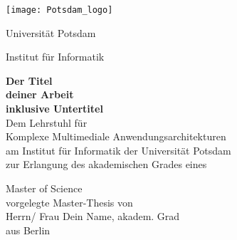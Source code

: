 \thispagestyle{empty}
\begin{center}
		
    \texttt{[image: Potsdam\_logo]}\\
    \vspace{.5cm}
    
    {\Large \sc Universität Potsdam}\\
    \vspace{1cm}
    
    {\Huge \sc Institut für Informatik\\[1mm]}
    
    \vspace{2cm}
    {\Huge \textbf{Der Titel}}\\
    \vspace*{3mm}
    {\Huge \textbf{deiner Arbeit}}\\
    \vspace*{3mm}
    {\large \textbf{inklusive Untertitel}}\\
    
    \vspace{2.0cm}
    {\large Dem Lehrstuhl für}\\
    {\large Komplexe Multimediale Anwendungsarchitekturen}\\
    {\large am Institut für Informatik der Universität Potsdam}\\
    {\large zur Erlangung des akademischen Grades eines}\\
    \vspace{1cm}
    
    {\Large \sc Master of Science}\\
    \vspace{1cm}
    {\large vorgelegte Master-Thesis von}\\
    
    \Large{Herrn/ Frau Dein Name, akadem. Grad}\\
    
    {\large aus Berlin}\\
    \vspace{5cm} %
\end{center}

